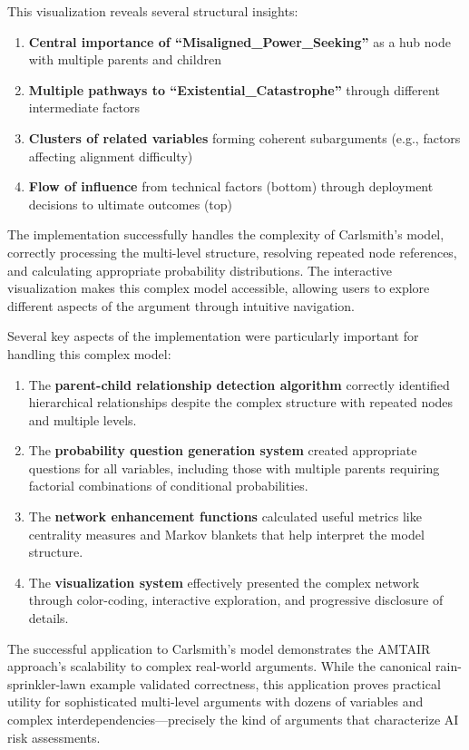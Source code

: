 \documentclass[
  11pt,
  letterpaper,
]{book}
\providecommand{\tightlist}{%
  \setlength{\itemsep}{0pt}\setlength{\parskip}{0pt}}
\begin{document}
\begin{landscape}
This visualization reveals several structural insights:

\begin{enumerate}
\def\labelenumi{\arabic{enumi}.}
\tightlist
\item
  \textbf{Central importance of ``Misaligned\_Power\_Seeking''} as a hub
  node with multiple parents and children
\item
  \textbf{Multiple pathways to ``Existential\_Catastrophe''} through
  different intermediate factors
\item
  \textbf{Clusters of related variables} forming coherent subarguments
  (e.g., factors affecting alignment difficulty)
\item
  \textbf{Flow of influence} from technical factors (bottom) through
  deployment decisions to ultimate outcomes (top)
\end{enumerate}

The implementation successfully handles the complexity of Carlsmith's
model, correctly processing the multi-level structure, resolving
repeated node references, and calculating appropriate probability
distributions. The interactive visualization makes this complex model
accessible, allowing users to explore different aspects of the argument
through intuitive navigation.

Several key aspects of the implementation were particularly important
for handling this complex model:

\begin{enumerate}
\def\labelenumi{\arabic{enumi}.}
\item
  The \textbf{parent-child relationship detection algorithm} correctly
  identified hierarchical relationships despite the complex structure
  with repeated nodes and multiple levels.
\item
  The \textbf{probability question generation system} created
  appropriate questions for all variables, including those with multiple
  parents requiring factorial combinations of conditional probabilities.
\item
  The \textbf{network enhancement functions} calculated useful metrics
  like centrality measures and Markov blankets that help interpret the
  model structure.
\item
  The \textbf{visualization system} effectively presented the complex
  network through color-coding, interactive exploration, and progressive
  disclosure of details.
\end{enumerate}

The successful application to Carlsmith's model demonstrates the AMTAIR
approach's scalability to complex real-world arguments. While the
canonical rain-sprinkler-lawn example validated correctness, this
application proves practical utility for sophisticated multi-level
arguments with dozens of variables and complex
interdependencies---precisely the kind of arguments that characterize AI
risk assessments.


\end{landscape}
\end{document}
